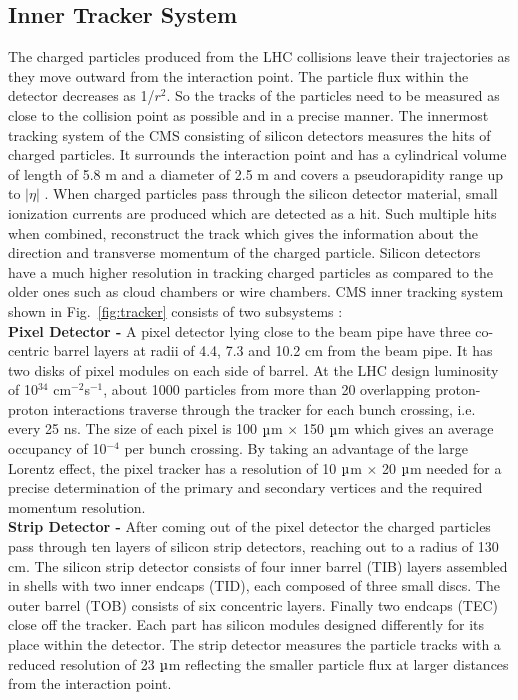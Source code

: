 \subsection{Inner Tracker System}
The charged particles produced from the LHC collisions leave their trajectories as they move outward from the interaction point. The particle flux within the detector decreases as 1/$r^2$. So the tracks of the particles need to be measured as close to the collision point as possible and in a precise manner. The innermost tracking system of the CMS consisting of silicon detectors measures the hits of charged particles. It surrounds the interaction point and has a cylindrical volume of length of 5.8 m and a diameter of 2.5 m and covers a pseudorapidity range up to $|\eta|$ . When charged particles pass through the silicon detector material, small ionization currents are produced which are detected as a hit. Such multiple hits when combined, reconstruct the track which gives the information about the direction and transverse momentum \pt of the charged particle. Silicon detectors have a much higher resolution in tracking charged particles as compared to the older ones such as cloud chambers or wire chambers. CMS inner tracking system shown in Fig.~\ref{fig:tracker} consists of two subsystems :\\ \newline 
{\bf Pixel Detector -} A pixel detector lying close to the beam pipe have three co-centric barrel layers at radii of 4.4, 7.3 and 10.2 cm from the beam pipe. It has two disks of pixel modules on each side of barrel. At the LHC design luminosity of 10$^{34}$ cm$^{-2}$s$^{-1}$, about 1000 particles from more than 20 overlapping proton-proton interactions traverse through the tracker for each bunch crossing, i.e. every 25 ns. The size of each pixel is 100 $\micro$m $\times$ 150 $\micro$m which gives an average occupancy of 10$^{-4}$ per bunch crossing. By taking an advantage of the large Lorentz effect, the pixel tracker has a resolution of 10 $\micro$m $\times$ 20 $\micro$m needed for a precise determination of the primary and secondary vertices and the required momentum resolution. \\ \newline
{\bf Strip Detector -} After coming out of the pixel detector the charged particles pass through ten layers of silicon strip detectors, reaching out to a radius of 130 cm. The silicon strip detector consists of four inner barrel (TIB) layers assembled in shells with two inner endcaps (TID), each composed of three small discs. The outer barrel (TOB) consists of six concentric layers. Finally two endcaps (TEC) close off the tracker. Each part has silicon modules designed differently for its place within the detector. The strip detector measures the particle tracks with a reduced resolution of 23 $\micro$m reflecting the smaller particle flux at larger distances from the interaction point.

